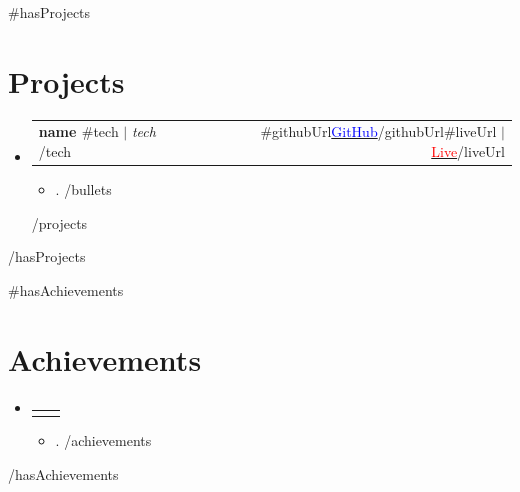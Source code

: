 \documentclass[letterpaper,11pt]{article}
\makeatletter
\newcommand{\resumeItem}[1]{\item\small{{#1 \vspace{-2pt}}}}
\newcommand{\resumeProjectHeading}[2]{
    \item
    \begin{tabular*}{0.97\textwidth}{l@{\extracolsep{\fill}}r}
      \small#1 & #2 \\
    \end{tabular*}\vspace{-7pt}
}
\newcommand{\resumeSubHeadingListStart}{\begin{itemize}[leftmargin=0.15in, label={}]}
\newcommand{\resumeSubHeadingListEnd}{\end{itemize}}
\newcommand{\resumeItemListStart}{\begin{itemize}}
\newcommand{\resumeItemListEnd}{\end{itemize}\vspace{-5pt}}
\makeatother
\begin{document}
{{#hasProjects}}
\section{Projects}
  \resumeSubHeadingListStart
{{#projects}}
    \resumeProjectHeading
      {\textbf{ {{ name }} }{{#tech}} $|$ \emph{ {{ tech }} }{{/tech}}}{ {{#githubUrl}}\href{ {{{ githubUrl }}} }{\textcolor{blue}{GitHub}}{{/githubUrl}}{{#liveUrl}} $|$ \href{ {{{ liveUrl }}} }{\textcolor{red}{Live}}{{/liveUrl}} }
      \resumeItemListStart
{{#bullets}}        \resumeItem{ {{ . }} }
{{/bullets}}      \resumeItemListEnd
{{/projects}}
  \resumeSubHeadingListEnd
{{/hasProjects}}

{{#hasAchievements}}
\section{Achievements}
\vspace{-13pt}
  \resumeSubHeadingListStart
    \resumeProjectHeading
      {}{}
      \resumeItemListStart
{{#achievements}}        \resumeItem{ {{ . }} }
{{/achievements}}      \resumeItemListEnd
  \resumeSubHeadingListEnd
{{/hasAchievements}}
\end{document}
